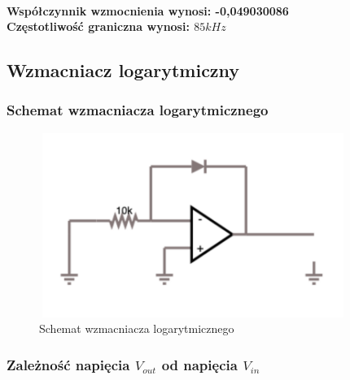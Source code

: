 \documentclass[a4paper,12pt]{article}
\begin{document}
\begin{justify}
\paragraph{Współczynnik wzmocnienia wynosi: -0,049030086 \\ Częstotliwość graniczna wynosi: $85kHz$}

\subsection{Wzmacniacz logarytmiczny}

\subsubsection{Schemat wzmacniacza logarytmicznego}

\begin{figure}[h]
\centering
\includegraphics[width=10cm, height=6cm]{wl}
\caption{Schemat wzmacniacza logarytmicznego}
\end{figure}

\subsubsection{Zależność napięcia $V_{out}$ od napięcia $V_{in}$}


\end{justify}
\end{document}
